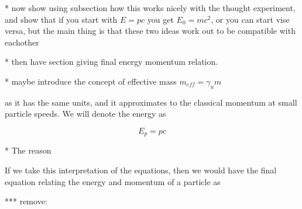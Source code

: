 






* now show using subsection how this works nicely with the thought experiment, and show that if you start with $E=pc$ you get $E_{0}= mc^2$, or you can start vise versa, but the main thing is that these two ideas work out to be compatible with eachother

* then have section giving final energy momentum relation.

* maybe introduce the concept of effective mass $m_{eff} = \gamma_{u} {m}$

as it has the same units, and it approximates to the classical momentum at small particle speeds.
We will denote the energy as

\begin{equation}
	{E_p} = {p} {c}
\end{equation}

* The reason

If we take this interpretation of the equations, then we would have the final equation relating the energy and momentum of a particle as

*** remove:


